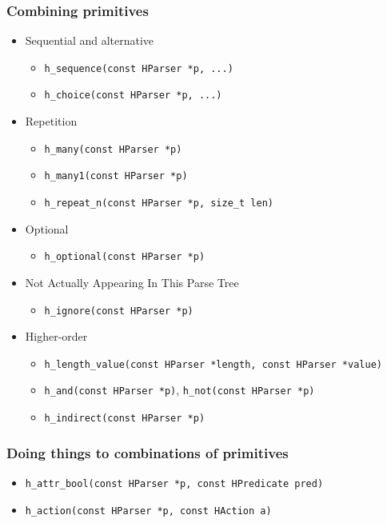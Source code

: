 \documentclass{beamer}
\begin{document}
\begin{frame}[fragile]
	\frametitle{Combining primitives}
	\begin{itemize}
		\item<1-> Sequential and alternative
			\begin{itemize}
				\item \texttt{h\_sequence(const HParser *p, ...)}
				\item \texttt{h\_choice(const HParser *p, ...)}
			\end{itemize}
		\item<2-> Repetition
			\begin{itemize}
				\item \texttt{h\_many(const HParser *p)}
				\item \texttt{h\_many1(const HParser *p)}
				\item \texttt{h\_repeat\_n(const HParser *p, size\_t len)}
			\end{itemize}
		\item<3-> Optional
			\begin{itemize}
				\item \texttt{h\_optional(const HParser *p)}
			\end{itemize}
		\item<4-> Not Actually Appearing In This Parse Tree
			\begin{itemize}
				\item \texttt{h\_ignore(const HParser *p)}
			\end{itemize}
		\item<5-> Higher-order
			\begin{itemize}
				\item \texttt{h\_length\_value(const HParser *length, const HParser *value)}
				\item \texttt{h\_and(const HParser *p)}, \texttt{h\_not(const HParser *p)}
				\item \texttt{h\_indirect(const HParser *p)}
			\end{itemize}
	\end{itemize}
\end{frame}

\begin{frame}[fragile]
	\frametitle{Doing things to combinations of primitives}
	\begin{itemize}
		\item<1-> \texttt{h\_attr\_bool(const HParser *p, const HPredicate pred)}
		\item<2-> \texttt{h\_action(const HParser *p, const HAction a)}
	\end{itemize}
\end{frame}
\end{document}
